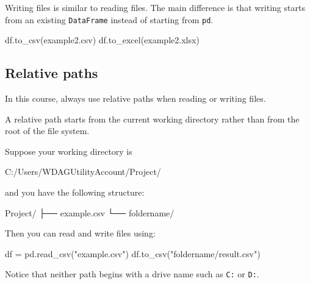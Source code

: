 \documentclass[
  letterpaper,
  DIV=11,
  numbers=noendperiod]{scrreprt}
\newenvironment{Shaded}{\begin{snugshade}}{\end{snugshade}}
\newcommand{\NormalTok}[1]{\textcolor[rgb]{0.00,0.23,0.31}{#1}}
\newcommand{\OperatorTok}[1]{\textcolor[rgb]{0.37,0.37,0.37}{#1}}
\newcommand{\StringTok}[1]{\textcolor[rgb]{0.13,0.47,0.30}{#1}}
\theoremstyle{definition}
\theoremstyle{definition}
\theoremstyle{plain}
\theoremstyle{plain}
\theoremstyle{remark}
\begin{document}
Writing files is similar to reading files. The main difference is that
writing starts from an existing \texttt{DataFrame} instead of starting
from \texttt{pd}.

\begin{Shaded}
\begin{Highlighting}[]
\NormalTok{df.to\_csv(}\StringTok{\textquotesingle{}example2.csv\textquotesingle{}}\NormalTok{)}
\NormalTok{df.to\_excel(}\StringTok{\textquotesingle{}example2.xlsx\textquotesingle{}}\NormalTok{)}
\end{Highlighting}
\end{Shaded}

\subsection{Relative paths}\label{relative-paths}

In this course, always use relative paths when reading or writing files.

A relative path starts from the current working directory rather than
from the root of the file system.

Suppose your working directory is

\begin{Shaded}
\begin{Highlighting}[]
\NormalTok{C:/Users/WDAGUtilityAccount/Project/}
\end{Highlighting}
\end{Shaded}

and you have the following structure:

\begin{Shaded}
\begin{Highlighting}[]
\NormalTok{Project/}
\NormalTok{├── example.csv}
\NormalTok{└── foldername/}
\end{Highlighting}
\end{Shaded}

Then you can read and write files using:

\begin{Shaded}
\begin{Highlighting}[]
\NormalTok{df }\OperatorTok{=}\NormalTok{ pd.read\_csv(}\StringTok{"example.csv"}\NormalTok{)}
\NormalTok{df.to\_csv(}\StringTok{"foldername/result.csv"}\NormalTok{)}
\end{Highlighting}
\end{Shaded}

Notice that neither path begins with a drive name such as \texttt{C:} or
\texttt{D:}.
\end{document}

